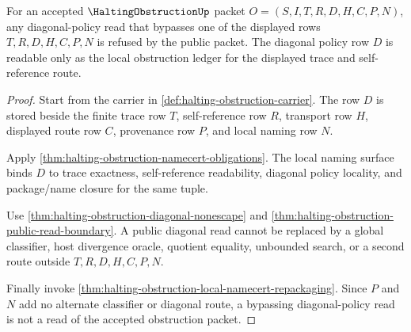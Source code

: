 \begin{theorem}
\label{thm:halting-obstruction-diagonal-policy-refusal}
For an accepted $\HaltingObstructionUp$ packet $O=(S,I,T,R,D,H,C,P,N)$, any diagonal-policy read that bypasses one of the displayed rows $T,R,D,H,C,P,N$ is refused by the public packet. The diagonal policy row $D$ is readable only as the local obstruction ledger for the displayed trace and self-reference route.
\end{theorem}
\begin{proof}
Start from the carrier in \autoref{def:halting-obstruction-carrier}. The row $D$ is stored beside the finite trace row $T$, self-reference row $R$, transport row $H$, displayed route row $C$, provenance row $P$, and local naming row $N$.

Apply \autoref{thm:halting-obstruction-namecert-obligations}. The local naming surface binds $D$ to trace exactness, self-reference readability, diagonal policy locality, and package/name closure for the same tuple.

Use \autoref{thm:halting-obstruction-diagonal-nonescape} and \autoref{thm:halting-obstruction-public-read-boundary}. A public diagonal read cannot be replaced by a global classifier, host divergence oracle, quotient equality, unbounded search, or a second route outside $T,R,D,H,C,P,N$.

Finally invoke \autoref{thm:halting-obstruction-local-namecert-repackaging}. Since $P$ and $N$ add no alternate classifier or diagonal route, a bypassing diagonal-policy read is not a read of the accepted obstruction packet.
\end{proof}

